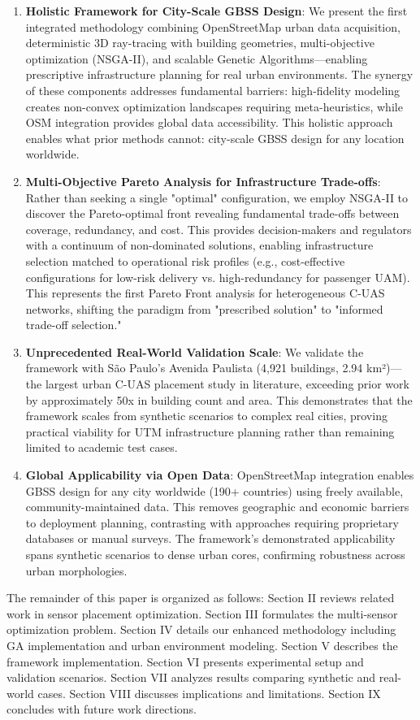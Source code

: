 \begin{enumerate}
\item \textbf{Holistic Framework for City-Scale GBSS Design}: We present the first integrated methodology combining OpenStreetMap urban data acquisition, deterministic 3D ray-tracing with building geometries, multi-objective optimization (NSGA-II), and scalable Genetic Algorithms—enabling prescriptive infrastructure planning for real urban environments. The synergy of these components addresses fundamental barriers: high-fidelity modeling creates non-convex optimization landscapes requiring meta-heuristics, while OSM integration provides global data accessibility. This holistic approach enables what prior methods cannot: city-scale GBSS design for any location worldwide.

\item \textbf{Multi-Objective Pareto Analysis for Infrastructure Trade-offs}: Rather than seeking a single "optimal" configuration, we employ NSGA-II to discover the Pareto-optimal front revealing fundamental trade-offs between coverage, redundancy, and cost. This provides decision-makers and regulators with a continuum of non-dominated solutions, enabling infrastructure selection matched to operational risk profiles (e.g., cost-effective configurations for low-risk delivery vs. high-redundancy for passenger UAM). This represents the first Pareto Front analysis for heterogeneous C-UAS networks, shifting the paradigm from "prescribed solution" to "informed trade-off selection."

\item \textbf{Unprecedented Real-World Validation Scale}: We validate the framework with São Paulo's Avenida Paulista (4,921 buildings, 2.94 km²)—the largest urban C-UAS placement study in literature, exceeding prior work by approximately 50x in building count and area. This demonstrates that the framework scales from synthetic scenarios to complex real cities, proving practical viability for UTM infrastructure planning rather than remaining limited to academic test cases.

\item \textbf{Global Applicability via Open Data}: OpenStreetMap integration enables GBSS design for any city worldwide (190+ countries) using freely available, community-maintained data. This removes geographic and economic barriers to deployment planning, contrasting with approaches requiring proprietary databases or manual surveys. The framework's demonstrated applicability spans synthetic scenarios to dense urban cores, confirming robustness across urban morphologies.
\end{enumerate}

The remainder of this paper is organized as follows: Section II reviews related work in sensor placement optimization. Section III formulates the multi-sensor optimization problem. Section IV details our enhanced methodology including GA implementation and urban environment modeling. Section V describes the framework implementation. Section VI presents experimental setup and validation scenarios. Section VII analyzes results comparing synthetic and real-world cases. Section VIII discusses implications and limitations. Section IX concludes with future work directions.

